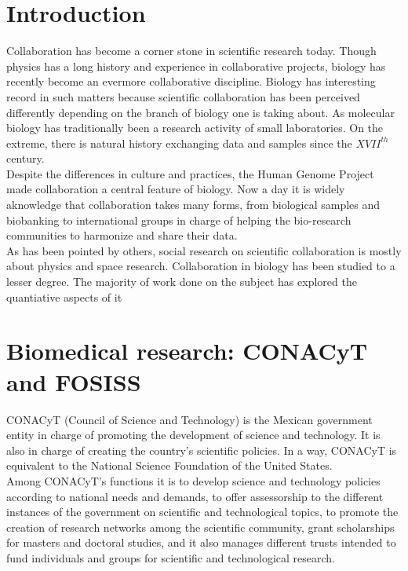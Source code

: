 \section{Introduction}
\label{intro}

Collaboration has become a corner stone in scientific research today. Though physics has a long history and experience in collaborative projects, biology has recently become an evermore collaborative discipline\cite{Vermeulen2013}. Biology has interesting record in such matters because scientific collaboration has been perceived differently depending on the branch of biology one is taking about. As molecular biology has traditionally been a research activity of small laboratories\cite{KnorrCetina1999,Strasser2006}. On the extreme, there is natural history exchanging data and samples since the $XVII^{th}$ century\cite{Muller2012,Strasser2012}.\\

Despite the differences in culture and practices, the Human Genome Project made collaboration a central feature of biology. Now a day it is widely aknowledge that collaboration takes many forms, from biological samples and biobanking to international groups in charge of helping the bio-research communities to harmonize and share their data.\\

As has been pointed by others, social research on scientific collaboration is mostly about physics and space research. Collaboration in biology has been studied to a lesser degree. The majority of work done on the subject has explored the quantiative aspects of it\cite{Newman2001}

\section{Biomedical research: CONACyT and FOSISS}
\label{sec:1}
CONACyT (Council of Science and Technology) is the Mexican government
entity in charge of promoting the development of science and 
technology. It is also in charge of creating the country's scientific
policies. In a way, CONACyT is equivalent to the National Science
Foundation of the United States.\\

Among CONACyT's functions it is to develop science and technology
policies according to national needs and demands, to offer
assessorship to the different instances of the government on
scientific and technological topics, to promote the creation of
research networks among the scientific community, grant scholarships
for masters and doctoral studies, and it also manages different trusts
intended to fund individuals and groups for scientific and
technological research.\\

